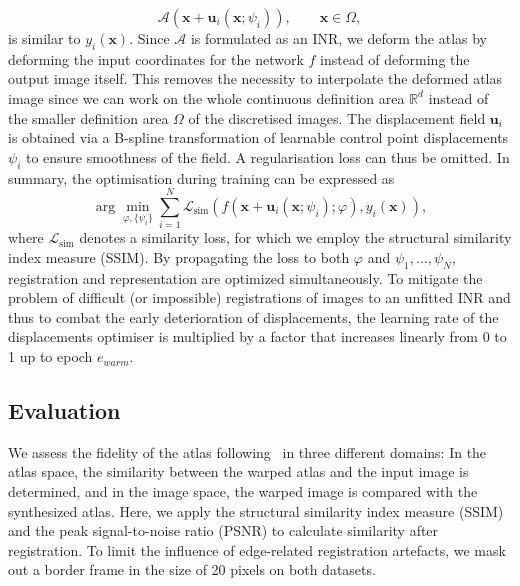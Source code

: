 \begin{equation}
    \mathcal{A}(\bm{x}+\bm{u}_{i}(\bm{x};\psi_{i})), \qquad \bm{x} \in \Omega,
\end{equation}
is similar to  $y_{i}(\mathbf{x})$. Since $\mathcal{A}$ is formulated as an INR, we deform the atlas by deforming the input coordinates for the network $f$ instead of deforming the output image itself. This removes the necessity to interpolate the deformed atlas image since we can work on the whole continuous definition area $\mathbb{R}^{d}$ instead of the smaller definition area $\Omega$ of the discretised images.
The displacement field $\bm{u}_{i}$ is obtained via a B-spline transformation of learnable control point displacements $\psi_{i}$ to ensure smoothness of the field. A regularisation loss can thus be omitted.
In summary, the optimisation during training can be expressed as
\begin{equation}
    \arg\min_{\varphi, \{\psi_{i}\}} \sum_{i=1}^{N} \mathcal{L}_{\text{sim}} (f(\bm{x}+\bm{u}_{i}(\bm{x};\psi_{i});\varphi), y_{i}(\bm{x})),
\end{equation}
where $\mathcal{L}_{\text{sim}}$ denotes a similarity loss, for which we employ the structural similarity index measure (SSIM). By propagating the loss to both $\varphi$ and $\psi_{1},\dots,\psi_{N}$, registration and representation are optimized simultaneously.
To mitigate the problem of difficult (or impossible) registrations of images to an unfitted INR and thus to combat the early deterioration of displacements, the learning rate of the displacements optimiser is multiplied by a factor that increases linearly from 0 to 1 up to epoch $e_{warm}$. 





\subsection{Evaluation}
We assess the fidelity of the atlas following~\cite{ding2022aladdin} in three different domains: In the atlas space, the similarity between the warped atlas and the input image is determined, and in the image space, the warped image is compared with the synthesized atlas. Here, we apply the structural similarity index measure (SSIM) and the peak signal-to-noise ratio (PSNR) to calculate similarity after registration. To limit the influence of edge-related registration artefacts, we mask out a border frame in the size of 20 pixels on both datasets. 

